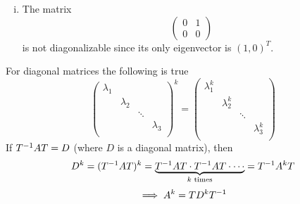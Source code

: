 \documentclass[../../script.tex]{subfiles}
\begin{document}
\begin{eg}
\begin{enumerate}[(i)]
        \item The matrix 
        \[
            \begin{pmatrix}
                0 & 1 \\ 0 & 0
            \end{pmatrix}
        \]
        is not diagonalizable since its only eigenvector is $(1, 0)^T$.
    \end{enumerate}
\end{eg}

\begin{rem}
    For diagonal matrices the following is true 
    \[
        \begin{pmatrix}
            \lambda_1 & & & \\
            & \lambda_2 & & \\
            & & \ddots & \\
            & & & \lambda_3 \\
        \end{pmatrix}^k
        =
        \begin{pmatrix}
            \lambda_1^k & & & \\
            & \lambda_2^k & & \\
            & & \ddots & \\
            & & & \lambda_3^k \\
        \end{pmatrix}
    \]
    If ${T}^{-1}AT = D$ (where $D$ is a diagonal matrix), then 
    \[
        D^k = ({T}^{-1}AT)^k = \underbrace{{T}^{-1}AT \cdot {T}^{-1}AT \cdot \cdots}_{k \text{ times}} = {T}^{-1}A^kT
    \]
    \[
        \implies A^k = TD^k{T}^{-1}
    \]
\end{rem}
\end{document}
